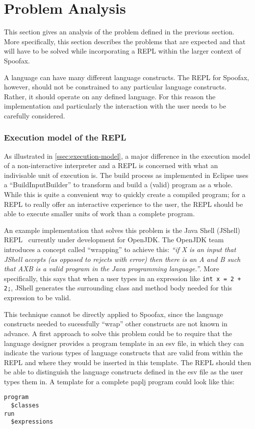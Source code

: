 \section{Problem Analysis}
\label{sec:problem-analysis}
This section gives an analysis of the problem defined in the previous section.
More specifically, this section describes the problems that are expected and
that will have to be solved while incorporating a REPL
within the larger context of Spoofax.

A language can have many different language constructs. The REPL for Spoofax,
however, should not be constrained to any particular language constructs.
Rather, it should operate on any defined language. For this reason the
implementation and particularly the interaction with the user needs to be
carefully considered.

\subsubsection{Execution model of the REPL}
\label{ssec:execution-model-repl}
As illustrated in \cref{ssec:execution-model}, a major difference in the
execution model of a non-interactive interpreter and a REPL is concerned with
what an indivisable unit of execution is. The build process as implemented in
Eclipse uses a ``BuildInputBuilder'' to transform and build a (valid) program
as a whole. While this is quite a convenient way to quickly create a compiled
program; for a REPL to really offer an interactive experience to the user, the
REPL should be able to execute smaller units of work than a complete program.

An example implementation that solves this problem is the Java Shell (JShell)
REPL~\cite{jshell-repl} currently under development for OpenJDK. The OpenJDK
team introduces a concept called ``wrapping'' to achieve this: \textit{``if X
is an input that JShell accepts (as opposed to rejects with error) then there
is an A and B such that AXB is a valid program in the Java programming
language.''}. More specifically, this says that when a user types in an
expression like \texttt{int x = 2 + 2;}, JShell generates the surrounding class and
method body needed for this expression to be valid.

This technique cannot be directly applied to Spoofax, since the language
constructs needed to sucessfully ``wrap'' other constructs are not known in
advance. A first approach to solve this problem could be to require that the
language designer provides a program template in an esv file, in which they can
indicate the various types of language constructs that are valid from within
the REPL and where they would be inserted in this template. The REPL should
then be able to distinguish the language constructs defined in the esv file as
the user types them in. A template for a complete paplj program could look
like this:
\begin{lstlisting}
program
  $classes
run
  $expressions
\end{lstlisting}

